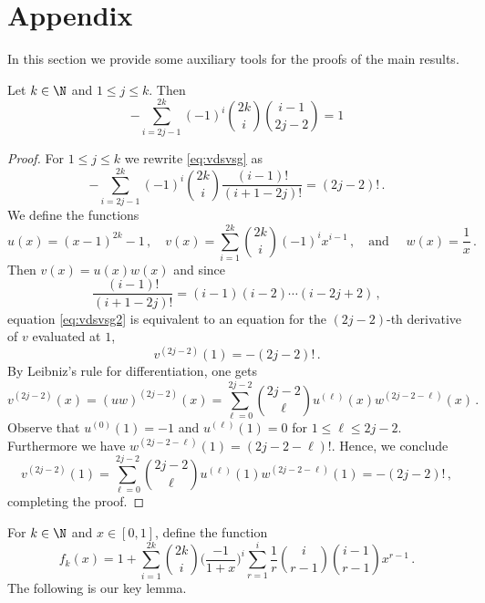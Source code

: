 \section{Appendix}
In this section we provide some auxiliary tools for the proofs of the main results.
\begin{lemma}\label{lem:fkgammaneww}
Let $k\in \N$ and $1\le j\le k$. Then
\begin{equation}\label{eq:vdsvsg}
-\sum_{i=2j-1}^{2k} (-1)^i \binom{2k}{i} \binom{i-1}{2j-2}=1
\end{equation}
\end{lemma}
\begin{proof}
For $1\le j\le k$ we rewrite \eqref{eq:vdsvsg} as 
\begin{equation}\label{eq:vdsvsg2}
-\sum_{i=2j-1}^{2k} (-1)^i \binom{2k}{i} \frac{(i-1)!}{(i+1-2j)!}=(2j-2)!\,.
\end{equation}
We define the functions
\begin{equation*}
u(x)=(x-1)^{2k}-1\,,\quad v(x)=\sum_{i=1}^{2k}  \binom{2k}{i}(-1)^i x^{i-1}\,,\quad \text{and } \quad w(x)=\frac{1}{x}\,.
\end{equation*}
Then $v(x)=u(x)w(x)$ and since
\begin{equation*}
\frac{(i-1)!}{(i+1-2j)!}=(i-1)(i-2)\cdots (i-2j+2)\,,
\end{equation*}
equation \eqref{eq:vdsvsg2} is equivalent to an equation for the $(2j-2)$-th derivative of $v$ evaluated at $1$,
\begin{equation*}
v^{(2j-2)}(1)=-(2j-2)!\,.
\end{equation*}
By Leibniz's rule for differentiation, one gets
\begin{equation*}
v^{(2j-2)}(x)= (uw)^{(2j-2)}(x)= \sum_{\ell=0}^{2j-2} \binom{2j-2}{\ell} u^{(\ell)}(x) w^{(2j-2-\ell)}(x)\,.
\end{equation*}
Observe that $u^{(0)}(1)=-1$ and $u^{(\ell)}(1)=0$ for $1\le \ell \le 2j-2$. Furthermore we have $w^{(2j-2-\ell)}(1) = (2j-2-\ell)!$. Hence, we conclude
\begin{equation*}
v^{(2j-2)}(1)= \sum_{\ell=0}^{2j-2} \binom{2j-2}{\ell} u^{(\ell)}(1) w^{(2j-2-\ell)}(1)=- (2j-2)!\,,
\end{equation*}
completing the proof.
\end{proof}
\par
For $k\in \N$ and $x\in [0,1]$, define the function
\begin{equation}\label{eq:fkgamma}
f_k(x)=1+\sum_{i=1}^{2k} \binom{2k}{i} \Big( \frac{-1}{1+x}\Big)^i \sum_{r=1}^i \frac{1}{r} \binom{i}{r-1} \binom{i-1}{r-1} x^{r-1}\,.
\end{equation}
The following is our key lemma. 


